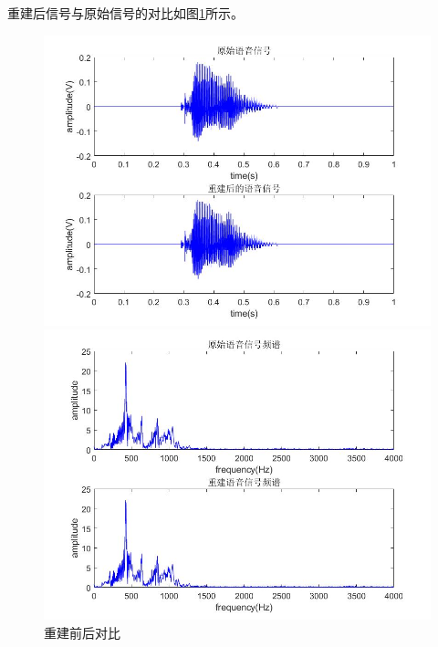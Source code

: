 \documentclass{../source/zju}
\begin{document}
        重建后信号与原始信号的对比如图\ref{对比}所示。
        \begin{figure}[H]
            \centering
            \begin{minipage}[t]{0.48\textwidth}
            \centering
            \includegraphics[width=\textwidth]{figure/时域对比.jpg}
            \end{minipage}
            \begin{minipage}[t]{0.48\textwidth}
            \centering
            \includegraphics[width=\textwidth]{figure/频域对比.jpg}
            \end{minipage}
            \caption{重建前后对比}
            \label{对比}
        \end{figure}
\end{document}
